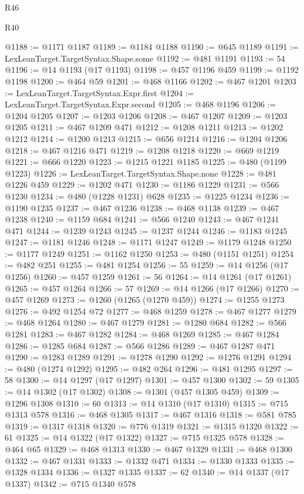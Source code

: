 \begin{lexlean}{R46}
\begin{lexlean}{R40}
\begin{coremodule}
{{{{{{{{{{{{{{{{{{{{{{{{{{{{{{{{{{{{{{{{{{{{{{{{{{{{{{{{{{{{{{{{{{{{{{{{{{{{{{{{{{{{{{{{{{{{{{{{{{{{{{{{{{{{{@1188 := @1171 @1187
@1189 := @1184 @1188
@1190 := @645 @1189
@1191 := LexLeanTarget.TargetSyntax.Shape.some
@1192 := @481 @1191
@1193 := 54
@1196 := @14 @1193 (@17 @1193)
@1198 := @457 @1196 @459
@1199 := @1192 @1198
@1200 := @464 @59
@1201 := @468 @1166
@1202 := @467 @1201
@1203 := LexLeanTarget.TargetSyntax.Expr.first
@1204 := LexLeanTarget.TargetSyntax.Expr.second
@1205 := @468 @1196
@1206 := @1204 @1205
@1207 := @1203 @1206
@1208 := @467 @1207
@1209 := @1203 @1205
@1211 := @467 @1209 @471
@1212 := @1208 @1211
@1213 := @1202 @1212
@1214 := @1200 @1213
@1215 := @656 @1214
@1216 := @1204 @1206
@1218 := @467 @1216 @471
@1219 := @1208 @1218
@1220 := @669 @1219
@1221 := @666 @1220
@1223 := @1215 @1221 @1185
@1225 := @480 (@1199 @1223)
@1226 := LexLeanTarget.TargetSyntax.Shape.none
@1228 := @481 @1226 @459
@1229 := @1202 @471
@1230 := @1186 @1229
@1231 := @566 @1230
@1234 := @480 (@1228 @1231) @628
@1235 := @1225 @1234
@1236 := @1190 @1235
@1237 := @467 @1236
@1238 := @468 @1138
@1239 := @467 @1238
@1240 := @1159 @684
@1241 := @566 @1240
@1243 := @467 @1241 @471
@1244 := @1239 @1243
@1245 := @1237 @1244
@1246 := @1183 @1245
@1247 := @1181 @1246
@1248 := @1171 @1247
@1249 := @1179 @1248
@1250 := @1177 @1249
@1251 := @1162 @1250
@1253 := @480 (@1151 @1251)
@1254 := @482 @251
@1255 := @481 @1254
@1256 := 55
@1259 := @14 @1256 (@17 @1256)
@1260 := @457 @1259
@1261 := 56
@1264 := @14 @1261 (@17 @1261)
@1265 := @457 @1264
@1266 := 57
@1269 := @14 @1266 (@17 @1266)
@1270 := @457 @1269
@1273 := @1260 (@1265 (@1270 @459))
@1274 := @1255 @1273
@1276 := @492 @1254 @72
@1277 := @468 @1259
@1278 := @467 @1277
@1279 := @468 @1264
@1280 := @467 @1279
@1281 := @1280 @684
@1282 := @566 @1281
@1283 := @467 @1282
@1284 := @468 @1269
@1285 := @467 @1284
@1286 := @1285 @684
@1287 := @566 @1286
@1289 := @467 @1287 @471
@1290 := @1283 @1289
@1291 := @1278 @1290
@1292 := @1276 @1291
@1294 := @480 (@1274 @1292)
@1295 := @482 @264
@1296 := @481 @1295
@1297 := 58
@1300 := @14 @1297 (@17 @1297)
@1301 := @457 @1300
@1302 := 59
@1305 := @14 @1302 (@17 @1302)
@1308 := @1301 (@457 @1305 @459)
@1309 := @1296 @1308
@1310 := 60
@1313 := @14 @1310 (@17 @1310)
@1315 := @715 @1313 @578
@1316 := @468 @1305
@1317 := @467 @1316
@1318 := @581 @785
@1319 := @1317 @1318
@1320 := @776 @1319
@1321 := @1315 @1320
@1322 := 61
@1325 := @14 @1322 (@17 @1322)
@1327 := @715 @1325 @578
@1328 := @464 @65
@1329 := @468 @1313
@1330 := @467 @1329
@1331 := @468 @1300
@1332 := @467 @1331
@1333 := @1332 @471
@1334 := @1330 @1333
@1335 := @1328 @1334
@1336 := @1327 @1335
@1337 := 62
@1340 := @14 @1337 (@17 @1337)
@1342 := @715 @1340 @578
}}}}}}}}}}}}}}}}}}}}}}}}}}}}}}}}}}}}}}}}}}}}}}}}}}}}}}}}}}}}}}}}}}}}}}}}}}}}}}}}}}}}}}}}}}}}}}}}}}}}}}}}}}}}}
\end{coremodule}
\end{lexlean}
\end{lexlean}
